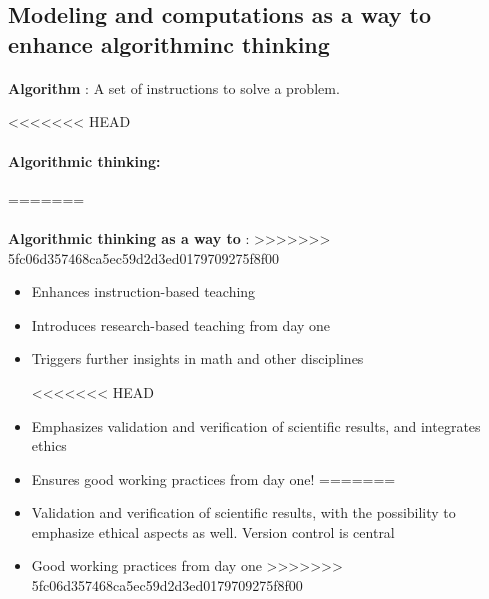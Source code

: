 \documentclass[%
<<<<<<< HEAD
oneside,                 %
final,                   %
=======
twoside,                 %
final,                   %
>>>>>>> 5fc06d357468ca5ec59d2d3ed0179709275f8f00
10pt]{article}
\begin{document}
\noindent



\subsection*{Modeling and computations as a way to enhance algorithminc thinking}


\paragraph{}
\textbf{Algorithm} :
A set of instructions to solve a problem.




<<<<<<< HEAD
\paragraph{Algorithmic thinking:}

=======
\paragraph{}
\textbf{Algorithmic  thinking as a way to} :
>>>>>>> 5fc06d357468ca5ec59d2d3ed0179709275f8f00
\begin{itemize}
\item Enhances instruction-based teaching

\item Introduces research-based teaching  from day one

\item Triggers further insights in math and other disciplines

<<<<<<< HEAD
\item Emphasizes validation and verification of scientific results, and integrates ethics

\item Ensures good working practices from day one!
=======
\item Validation and verification of scientific results, with the possibility to emphasize ethical aspects as well. Version control is central

\item Good working practices from day one
>>>>>>> 5fc06d357468ca5ec59d2d3ed0179709275f8f00
\end{itemize}
\end{document}
